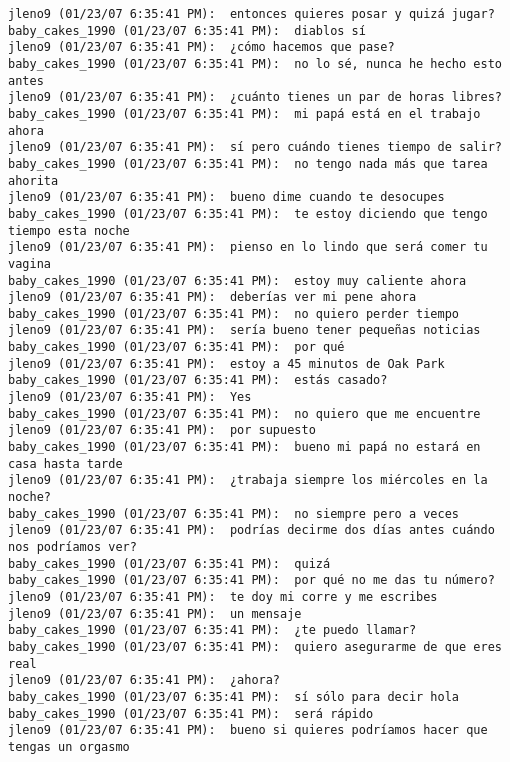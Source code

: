 \begin{verbatim}
jleno9 (01/23/07 6:35:41 PM):  entonces quieres posar y quizá jugar?
baby_cakes_1990 (01/23/07 6:35:41 PM):  diablos sí
jleno9 (01/23/07 6:35:41 PM):  ¿cómo hacemos que pase?
baby_cakes_1990 (01/23/07 6:35:41 PM):  no lo sé, nunca he hecho esto antes
jleno9 (01/23/07 6:35:41 PM):  ¿cuánto tienes un par de horas libres?
baby_cakes_1990 (01/23/07 6:35:41 PM):  mi papá está en el trabajo ahora
jleno9 (01/23/07 6:35:41 PM):  sí pero cuándo tienes tiempo de salir?
baby_cakes_1990 (01/23/07 6:35:41 PM):  no tengo nada más que tarea ahorita
jleno9 (01/23/07 6:35:41 PM):  bueno dime cuando te desocupes
baby_cakes_1990 (01/23/07 6:35:41 PM):  te estoy diciendo que tengo tiempo esta noche
jleno9 (01/23/07 6:35:41 PM):  pienso en lo lindo que será comer tu vagina
baby_cakes_1990 (01/23/07 6:35:41 PM):  estoy muy caliente ahora
jleno9 (01/23/07 6:35:41 PM):  deberías ver mi pene ahora
baby_cakes_1990 (01/23/07 6:35:41 PM):  no quiero perder tiempo
jleno9 (01/23/07 6:35:41 PM):  sería bueno tener pequeñas noticias
baby_cakes_1990 (01/23/07 6:35:41 PM):  por qué
jleno9 (01/23/07 6:35:41 PM):  estoy a 45 minutos de Oak Park
baby_cakes_1990 (01/23/07 6:35:41 PM):  estás casado?
jleno9 (01/23/07 6:35:41 PM):  Yes 
baby_cakes_1990 (01/23/07 6:35:41 PM):  no quiero que me encuentre
jleno9 (01/23/07 6:35:41 PM):  por supuesto
baby_cakes_1990 (01/23/07 6:35:41 PM):  bueno mi papá no estará en casa hasta tarde
jleno9 (01/23/07 6:35:41 PM):  ¿trabaja siempre los miércoles en la noche?
baby_cakes_1990 (01/23/07 6:35:41 PM):  no siempre pero a veces
jleno9 (01/23/07 6:35:41 PM):  podrías decirme dos días antes cuándo nos podríamos ver?
baby_cakes_1990 (01/23/07 6:35:41 PM):  quizá
baby_cakes_1990 (01/23/07 6:35:41 PM):  por qué no me das tu número?
jleno9 (01/23/07 6:35:41 PM):  te doy mi corre y me escribes
jleno9 (01/23/07 6:35:41 PM):  un mensaje
baby_cakes_1990 (01/23/07 6:35:41 PM):  ¿te puedo llamar?
baby_cakes_1990 (01/23/07 6:35:41 PM):  quiero asegurarme de que eres real
jleno9 (01/23/07 6:35:41 PM):  ¿ahora?
baby_cakes_1990 (01/23/07 6:35:41 PM):  sí sólo para decir hola
baby_cakes_1990 (01/23/07 6:35:41 PM):  será rápido
jleno9 (01/23/07 6:35:41 PM):  bueno si quieres podríamos hacer que tengas un orgasmo
\end{verbatim}


